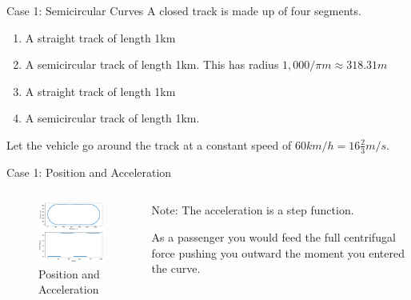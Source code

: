 \documentclass{beamer}
\begin{document}
\begin{frame}{Case 1: Semicircular Curves}
	A closed  track is made up of four segments.
	\begin{enumerate}
		\item A straight track of length 1km
		\item A semicircular track of length 1km. This has radius $1,000 / \pi m \approx 318.31m$
		\item A straight track of length 1km
		\item A semicircular track of length 1km.
	\end{enumerate}
	Let the vehicle go around the track at a constant speed of $60 km/h = 16 \frac{2}{3} m/s$.
\end{frame}

\begin{frame}{Case 1: Position and Acceleration}
	\begin{columns}
		\begin{column}{0.8\textwidth}			
			\begin{figure}
				\caption{Position and Acceleration}
				\centering
				\includegraphics[width=70mm, scale=0.2]{circular_track.png}
			\end{figure}
		\end{column}
		\begin{column}{0.33\textwidth}
			Note: The acceleration is a step function. 
			
			
			As a passenger you would feed the full centrifugal force pushing you outward the moment you entered the curve. 		
		\end{column}
	\end{columns}
\end{frame}
\end{document}
